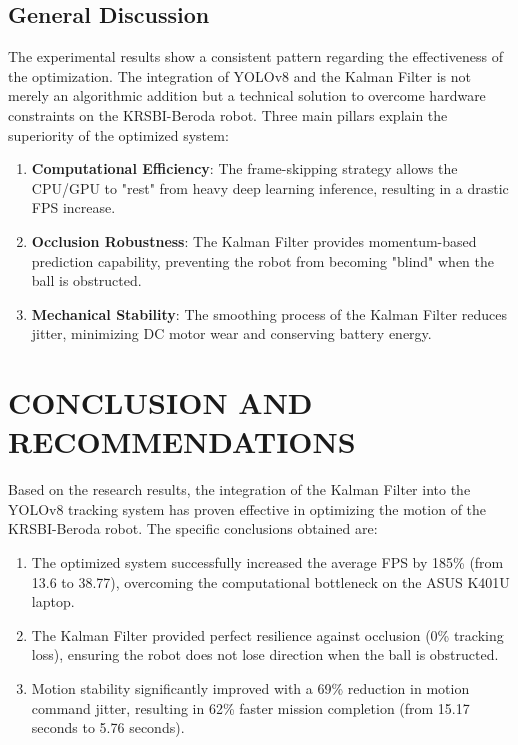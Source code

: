 \documentclass[12pt,a4paper]{article}
\begin{document}
\subsection{General Discussion}
The experimental results show a consistent pattern regarding the effectiveness of the optimization. The integration of YOLOv8 and the Kalman Filter is not merely an algorithmic addition but a technical solution to overcome hardware constraints on the KRSBI-Beroda robot. Three main pillars explain the superiority of the optimized system:

\begin{enumerate}
    \item \textbf{Computational Efficiency}: The frame-skipping strategy allows the CPU/GPU to "rest" from heavy deep learning inference, resulting in a drastic FPS increase.
    \item \textbf{Occlusion Robustness}: The Kalman Filter provides momentum-based prediction capability, preventing the robot from becoming "blind" when the ball is obstructed.
    \item \textbf{Mechanical Stability}: The smoothing process of the Kalman Filter reduces jitter, minimizing DC motor wear and conserving battery energy.
\end{enumerate}

\section{CONCLUSION AND RECOMMENDATIONS}

Based on the research results, the integration of the Kalman Filter into the YOLOv8 tracking system has proven effective in optimizing the motion of the KRSBI-Beroda robot. The specific conclusions obtained are:
\begin{enumerate}
    \item The optimized system successfully increased the average FPS by 185\% (from 13.6 to 38.77), overcoming the computational bottleneck on the ASUS K401U laptop.
    \item The Kalman Filter provided perfect resilience against occlusion (0\% tracking loss), ensuring the robot does not lose direction when the ball is obstructed.
    \item Motion stability significantly improved with a 69\% reduction in motion command jitter, resulting in 62\% faster mission completion (from 15.17 seconds to 5.76 seconds).
\end{enumerate}
\end{document}

